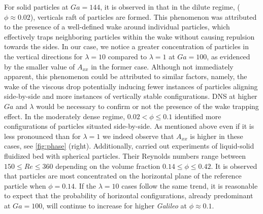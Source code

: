 For solid particles at $Ga = 144$, it is observed in \citet{shajahan2023inertial} that in the dilute regime, ($\phi \approx 0.02$), verticals raft of particles are formed. This phenomenon was attributed to the presence of a well-defined wake around individual particles, which effectively traps neighboring particles within the wake without causing repulsion towards the sides.%
In our case, we notice a greater concentration of particles in the vertical directions for $\lambda = 10$ compared to $\lambda = 1$ at $Ga = 100$, as evidenced by the smaller value of $A_{xx}$ in the former case. Although not immediately apparent, this phenomenon could be attributed to similar factors, namely, the wake of the viscous drop potentially inducing fewer instances of particles aligning side-by-side and more instances of vertically stable configurations. DNS at higher $Ga$ and $\lambda$ would be necessary to confirm or not the presence of the wake trapping effect. %
In the moderately dense regime,  $0.02 < \phi \le 0.1$  \citet{shajahan2023inertial} identified more configurations of particles situated side-by-side. 
As mentioned above even if it is less pronounced than for $\lambda = 1$ we indeed observe that $A_{xx}$ is higher in these cases, see \ref{fig:phase} (right). 
Additionally, \citet{almeras2021statistics} carried out experiments of liquid-solid fluidized bed with spherical particles. 
Their Reynolds numbers range between $150\leq Re \leq 360$ depending on the volume fraction $0.14 \leq \phi \leq 0.42$.
It is observed that particles are most concentrated on the horizontal plane of the reference particle when $\phi = 0.14$.
If the $\lambda = 10$ cases follow the same trend, it is reasonable to expect that the probability of horizontal configurations, already predominant at $Ga =100$, will continue to increase for higher \textit{Galileo} at $\phi  \approx 0.1$.


